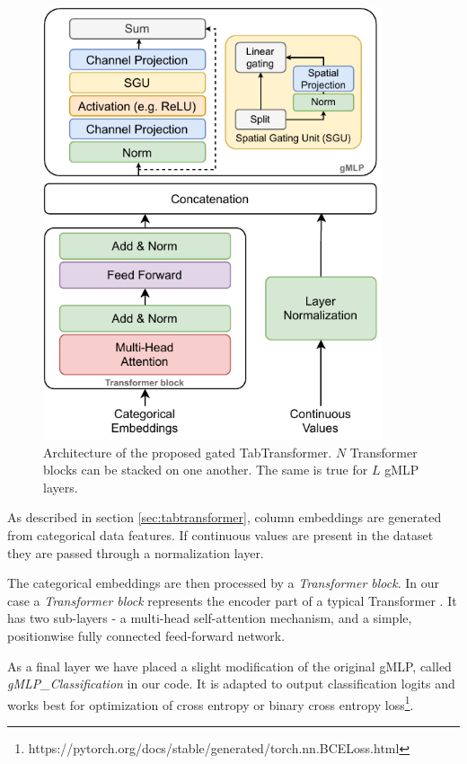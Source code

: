 \documentclass{article}
\begin{document}
\begin{figure}[hpt]
  \begin{center}
      \includegraphics[width=10cm]{Gated_TabTransformer.pdf}
  \end{center}
  \caption{Architecture of the proposed gated TabTransformer. $N$ Transformer blocks can be stacked on one another. The same is true for $L$ gMLP layers.}
  \label{fig:model}
\end{figure}

As described in section \ref{sec:tabtransformer}, column embeddings are generated from categorical data features. If continuous values are present in the dataset they are passed through a normalization layer.

The categorical embeddings are then processed by a \textit{Transformer block}. In our case a \textit{Transformer block} represents the encoder part of a typical Transformer \cite{vaswani2017attention}. It has two sub-layers -  a multi-head self-attention mechanism, and a simple, positionwise fully connected feed-forward network.

As a final layer we have placed a slight modification of the original gMLP, called \textit{gMLP\_Classification} in our code. It is adapted to output classification logits and works best for optimization of cross entropy or binary cross entropy loss\footnote{https://pytorch.org/docs/stable/generated/torch.nn.BCELoss.html}.
\end{document}
